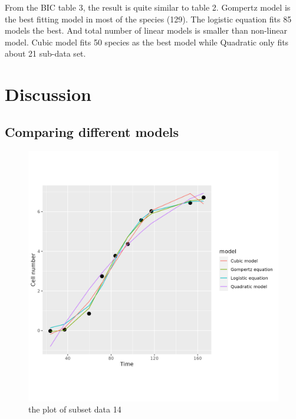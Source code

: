 \documentclass{article}
\begin{document}
From the BIC table 3, the result is quite similar to  table 2. Gompertz model is the best fitting model in most of the species (129). The logistic equation fits 85 models the best. And total number of linear models is smaller than non-linear model. Cubic model fits 50 species as the best model while Quadratic only fits about 21 sub-data set.


\section{Discussion}
\subsection{Comparing different models}
\begin{figure}
    \centering
    \includegraphics[width=0.5\linewidth]{../results/subset_ 14 _plot.png}
    \caption{the plot of subset data 14}
    \label{fig:subset1-plot14}
\end{figure}
\end{document}
